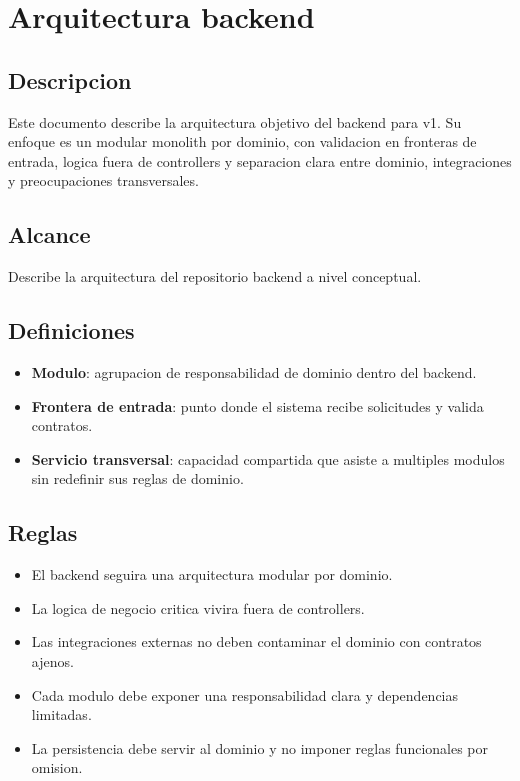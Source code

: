 \section{Arquitectura backend}

\subsection{Descripcion}

Este documento describe la arquitectura objetivo del backend para v1. Su enfoque es un modular monolith por dominio, con validacion en fronteras de entrada, logica fuera de controllers y separacion clara entre dominio, integraciones y preocupaciones transversales.

\subsection{Alcance}

Describe la arquitectura del repositorio backend a nivel conceptual.

\subsection{Definiciones}

\begin{itemize}
  \item \textbf{Modulo}: agrupacion de responsabilidad de dominio dentro del backend.
  \item \textbf{Frontera de entrada}: punto donde el sistema recibe solicitudes y valida contratos.
  \item \textbf{Servicio transversal}: capacidad compartida que asiste a multiples modulos sin redefinir sus reglas de dominio.
\end{itemize}

\subsection{Reglas}

\begin{itemize}
  \item El backend seguira una arquitectura modular por dominio.
  \item La logica de negocio critica vivira fuera de controllers.
  \item Las integraciones externas no deben contaminar el dominio con contratos ajenos.
  \item Cada modulo debe exponer una responsabilidad clara y dependencias limitadas.
  \item La persistencia debe servir al dominio y no imponer reglas funcionales por omision.
\end{itemize}

